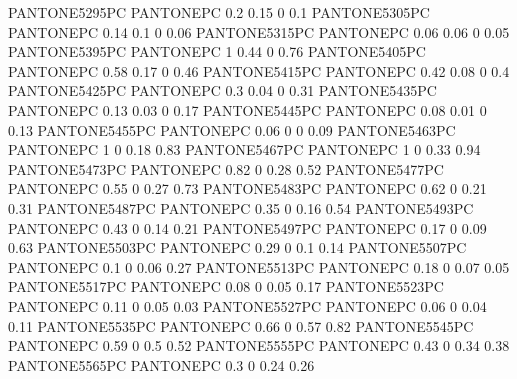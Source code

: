  {PANTONE5295PC} {PANTONE\SpotSpace PC} {0.2 0.15 0 0.1}
 {PANTONE5305PC} {PANTONE\SpotSpace PC} {0.14 0.1 0 0.06}
 {PANTONE5315PC} {PANTONE\SpotSpace PC} {0.06 0.06 0 0.05}
 {PANTONE5395PC} {PANTONE\SpotSpace PC} {1 0.44 0 0.76}
 {PANTONE5405PC} {PANTONE\SpotSpace PC} {0.58 0.17 0 0.46}
 {PANTONE5415PC} {PANTONE\SpotSpace PC} {0.42 0.08 0 0.4}
 {PANTONE5425PC} {PANTONE\SpotSpace PC} {0.3 0.04 0 0.31}
 {PANTONE5435PC} {PANTONE\SpotSpace PC} {0.13 0.03 0 0.17}
 {PANTONE5445PC} {PANTONE\SpotSpace PC} {0.08 0.01 0 0.13}
 {PANTONE5455PC} {PANTONE\SpotSpace PC} {0.06 0 0 0.09}
 {PANTONE5463PC} {PANTONE\SpotSpace PC} {1 0 0.18 0.83}
 {PANTONE5467PC} {PANTONE\SpotSpace PC} {1 0 0.33 0.94}
 {PANTONE5473PC} {PANTONE\SpotSpace PC} {0.82 0 0.28 0.52}
 {PANTONE5477PC} {PANTONE\SpotSpace PC} {0.55 0 0.27 0.73}
 {PANTONE5483PC} {PANTONE\SpotSpace PC} {0.62 0 0.21 0.31}
 {PANTONE5487PC} {PANTONE\SpotSpace PC} {0.35 0 0.16 0.54}
 {PANTONE5493PC} {PANTONE\SpotSpace PC} {0.43 0 0.14 0.21}
 {PANTONE5497PC} {PANTONE\SpotSpace PC} {0.17 0 0.09 0.63}
 {PANTONE5503PC} {PANTONE\SpotSpace PC} {0.29 0 0.1 0.14}
 {PANTONE5507PC} {PANTONE\SpotSpace PC} {0.1 0 0.06 0.27}
 {PANTONE5513PC} {PANTONE\SpotSpace PC} {0.18 0 0.07 0.05}
 {PANTONE5517PC} {PANTONE\SpotSpace PC} {0.08 0 0.05 0.17}
 {PANTONE5523PC} {PANTONE\SpotSpace PC} {0.11 0 0.05 0.03}
 {PANTONE5527PC} {PANTONE\SpotSpace PC} {0.06 0 0.04 0.11}
 {PANTONE5535PC} {PANTONE\SpotSpace PC} {0.66 0 0.57 0.82}
 {PANTONE5545PC} {PANTONE\SpotSpace PC} {0.59 0 0.5 0.52}
 {PANTONE5555PC} {PANTONE\SpotSpace PC} {0.43 0 0.34 0.38}
 {PANTONE5565PC} {PANTONE\SpotSpace PC} {0.3 0 0.24 0.26}
